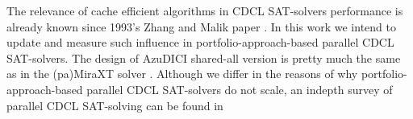 The relevance of cache efficient algorithms in CDCL 
SAT-solvers performance is already known since 1993's 
Zhang and Malik paper \cite{ZhangMalik2003SAT}. In this
work we intend to update and measure such influence
in portfolio-approach-based parallel CDCL SAT-solvers.
The design of AzuDICI shared-all version is pretty much 
the same as in the (pa)MiraXT solver \cite{paMiraXT}.
Although we differ in the reasons of why portfolio-approach-based
parallel CDCL SAT-solvers do not scale, an indepth survey 
of parallel CDCL SAT-solving can be found in \cite{survey-psolvers}